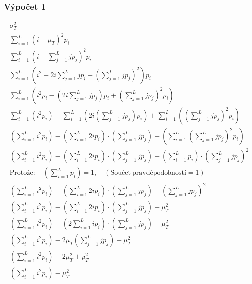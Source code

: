 \documentclass[12pt, a4paper]{report}
\begin{document}
\subsubsection*{Výpočet 1}
\begin{eqnarray}
	\sigma_{T}^{2}\\
	\sum_{i = 1}^{L} \left( i - \mu_T \right)^2  p_i\\
	\sum_{i = 1}^{L} \left( i - \sum_{j = 1}^{L} j  p_j \right)^2  p_i\\
	\sum_{i = 1}^{L} \left( i^2 - 2  i  \sum_{j = 1}^{L} j  p_j + \left( \sum_{j = 1}^{L} j p_j \right)^2 \right)  p_i\\
	\sum_{i = 1}^{L} \left( i^2 p_i - \left( 2  i  \sum_{j = 1}^{L} j  p_j \right) p_i + \left( \sum_{j = 1}^{L} j p_j \right)^2  p_i \right)\\
	\sum_{i = 1}^{L} \left( i^2 p_i \right) - \sum_{i = 1}^{L} \left(  2  i \left( \sum_{j = 1}^{L} j  p_j \right) p_i \right) + \sum_{i = 1}^{L} \left( \left( \sum_{j = 1}^{L} j p_j \right)^2  p_i \right)\\
	\left( \sum_{i = 1}^{L} i^2 p_i \right) - \left( \sum_{i = 1}^{L} 2 i p_i \right) \cdot \left( \sum_{j = 1}^{L} j p_j \right) + \left(  \sum_{i = 1}^{L} \left( \sum_{j = 1}^{L} j p_j \right)^2 p_i \right)\\
	\left( \sum_{i = 1}^{L} i^2 p_i \right) - \left( \sum_{i = 1}^{L} 2 i p_i \right) \cdot \left( \sum_{j = 1}^{L} j p_j \right) + \left(  \sum_{i = 1}^{L} p_i \right) \cdot  \left( \sum_{j = 1}^{L} j p_j \right)^2\\
	\mathrm{Protože:} \quad \left(  \sum_{i = 1}^{L} p_i \right)  = 1, \quad \left( \mathrm{Součet~pravděpodobností = 1} \right) \\
	\left( \sum_{i = 1}^{L} i^2 p_i \right) - \left( \sum_{i = 1}^{L} 2 i p_i \right) \cdot \left( \sum_{j = 1}^{L} j p_j \right) + \left( \sum_{j = 1}^{L} j p_j \right)^2\\
	\left( \sum_{i = 1}^{L} i^2 p_i \right) - \left( \sum_{i = 1}^{L} 2 i p_i \right) \cdot \left( \sum_{j = 1}^{L} j p_j \right) + \mu_T^2\\
	\left( \sum_{i = 1}^{L} i^2 p_i \right) - \left( 2 \sum_{i = 1}^{L} i p_i \right) \cdot \left( \sum_{j = 1}^{L} j p_j \right) + \mu_T^2\\
	\left( \sum_{i = 1}^{L} i^2 p_i \right) - 2 \mu_T \left( \sum_{j = 1}^{L} j p_j \right) + \mu_T^2\\
	\left( \sum_{i = 1}^{L} i^2 p_i \right) - 2 \mu_T^2 + \mu_T^2\\
	\left( \sum_{i = 1}^{L} i^2 p_i \right) - \mu_T^2
\end{eqnarray}
\end{document}
